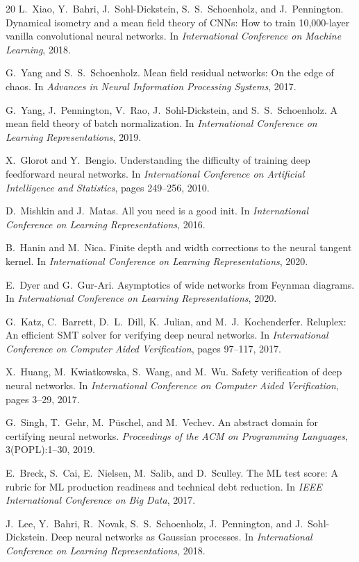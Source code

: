 \documentclass[10pt]{article}
\begin{document}
\begin{thebibliography}{20}
L.~Xiao, Y.~Bahri, J.~Sohl-Dickstein, S.~S.~Schoenholz, and J.~Pennington.
\newblock Dynamical isometry and a mean field theory of {CNN}s: How to train 10,000-layer vanilla convolutional neural networks.
\newblock In \emph{International Conference on Machine Learning}, 2018.

G.~Yang and S.~S.~Schoenholz.
\newblock Mean field residual networks: On the edge of chaos.
\newblock In \emph{Advances in Neural Information Processing Systems}, 2017.

G.~Yang, J.~Pennington, V.~Rao, J.~Sohl-Dickstein, and S.~S.~Schoenholz.
\newblock A mean field theory of batch normalization.
\newblock In \emph{International Conference on Learning Representations}, 2019.

X.~Glorot and Y.~Bengio.
\newblock Understanding the difficulty of training deep feedforward neural networks.
\newblock In \emph{International Conference on Artificial Intelligence and Statistics}, pages 249--256, 2010.

D.~Mishkin and J.~Matas.
\newblock All you need is a good init.
\newblock In \emph{International Conference on Learning Representations}, 2016.

B.~Hanin and M.~Nica.
\newblock Finite depth and width corrections to the neural tangent kernel.
\newblock In \emph{International Conference on Learning Representations}, 2020.

E.~Dyer and G.~Gur-Ari.
\newblock Asymptotics of wide networks from {F}eynman diagrams.
\newblock In \emph{International Conference on Learning Representations}, 2020.

G.~Katz, C.~Barrett, D.~L.~Dill, K.~Julian, and M.~J.~Kochenderfer.
\newblock Reluplex: An efficient {SMT} solver for verifying deep neural networks.
\newblock In \emph{International Conference on Computer Aided Verification}, pages 97--117, 2017.

X.~Huang, M.~Kwiatkowska, S.~Wang, and M.~Wu.
\newblock Safety verification of deep neural networks.
\newblock In \emph{International Conference on Computer Aided Verification}, pages 3--29, 2017.

G.~Singh, T.~Gehr, M.~P{\"u}schel, and M.~Vechev.
\newblock An abstract domain for certifying neural networks.
\newblock \emph{Proceedings of the ACM on Programming Languages}, 3(POPL):1--30, 2019.

E.~Breck, S.~Cai, E.~Nielsen, M.~Salib, and D.~Sculley.
\newblock The {ML} test score: A rubric for {ML} production readiness and technical debt reduction.
\newblock In \emph{IEEE International Conference on Big Data}, 2017.

J.~Lee, Y.~Bahri, R.~Novak, S.~S.~Schoenholz, J.~Pennington, and J.~Sohl-Dickstein.
\newblock Deep neural networks as {G}aussian processes.
\newblock In \emph{International Conference on Learning Representations}, 2018.

\end{thebibliography}
\end{document}
